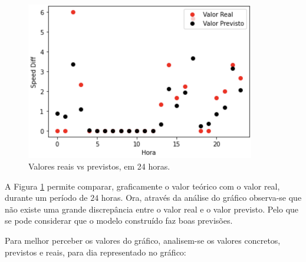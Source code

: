 \documentclass[a4paper, 12pt]{article}
\begin{document}
\begin{figure}[H]
	\centering
	\includegraphics[width=10cm]{resultados/real_prev_1.png}
	\caption{Valores reais vs previstos, em 24 horas.}
	\label{figure:real_prev_1}
\end{figure}

A Figura \ref{figure:real_prev_1} permite comparar, graficamente o valor teórico com o valor real, durante um período de $24$ horas. Ora, através da análise do gráfico observa-se que não existe uma grande discrepância entre o valor real e o valor previsto. Pelo que se pode considerar que o modelo construído faz boas previsões.

Para melhor perceber os valores do gráfico, analisem-se os valores concretos, previstos e reais, para dia representado no gráfico:
\end{document}
